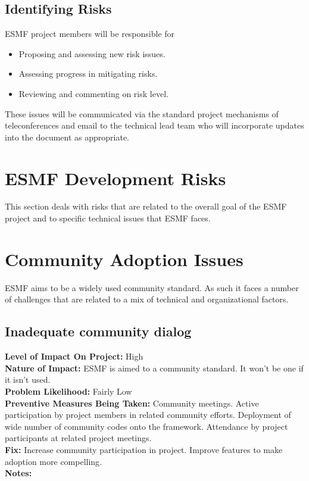 \documentclass[english]{article}
\newcommand{\req}[1]{\section{\hspace{.2in}#1}}
\newcommand{\sreq}[1]{\subsection{\hspace{.2in}#1}}
\newenvironment
{reqlist}
{\begin{list} {} {} \rm \item[]}
{\end{list}}
\begin{document}
\subsection{Identifying Risks}
ESMF project members will be responsible for
\begin{itemize}
\item Proposing and assessing new risk issues.
\item Assessing progress in mitigating risks.
\item Reviewing and commenting on risk level.
\end{itemize}
These issues will be communicated via the standard 
project mechanisms of teleconferences and email to the technical lead team who will incorporate updates
into the document as appropriate.

\section{ESMF Development Risks}

This section deals with risks that are related to the overall goal of the ESMF project and
to specific technical issues that ESMF faces.

\req{Community Adoption Issues}
ESMF aims to be a widely used community standard. As such it faces a number of challenges that are
related to a mix of technical and organizational factors.
\sreq{Inadequate community dialog}
\begin{reqlist}
{\bf Level of Impact On Project:}  High \\
{\bf Nature of Impact:} ESMF is aimed to a community standard. It won't be one if it isn't used.\\
{\bf Problem Likelihood:} Fairly Low\\
{\bf Preventive Measures Being Taken:} Community meetings. Active participation by project
members in related community efforts. Deployment of wide number of community codes
onto the framework. Attendance by project participants at related project
meetings.\\
{\bf Fix:} Increase community participation in project. Improve features to make
adoption more compelling.\\
{\bf Notes:} \\
\end{reqlist}
\end{document}
